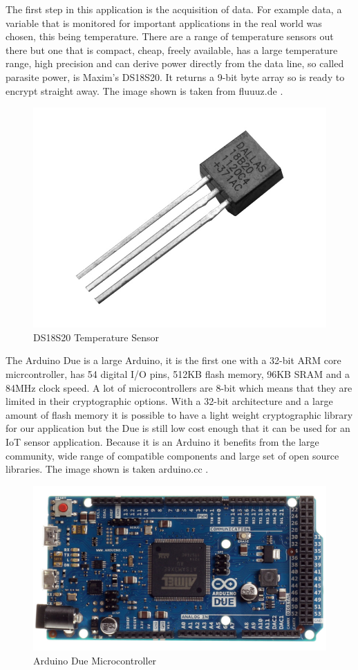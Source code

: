 The first step in this application is the acquisition of data. For example data, a variable that is monitored for important applications in the real world was chosen, this being temperature. There are a range of temperature sensors out there but one that is compact, cheap, freely available, has a large temperature range, high precision and can derive power directly from the data line, so called parasite power, is Maxim's DS18S20. It returns a 9-bit byte array so is ready to encrypt straight away. The image shown is taken from fluuuz.de \cite{dsimage}.

\begin{figure}[H]
	\centering
	\includegraphics[width=.4\linewidth]{Figures/ds.jpg}
	\caption{DS18S20 Temperature Sensor}
	\label{fig:ds}
\end{figure}

The Arduino Due is a large Arduino, it is the first one with a 32-bit ARM core micrcontroller, has 54 digital I/O pins, 512KB flash memory, 96KB SRAM and a 84MHz clock speed. A lot of microcontrollers are 8-bit which means that they are limited in their cryptographic options. With a 32-bit architecture and a large amount of flash memory it is possible to have a light weight cryptographic library for our application but the Due is still low cost enough that it can be used for an IoT sensor application. Because it is an Arduino it benefits from the large community, wide range of compatible components and large set of open source libraries. The image shown is taken arduino.cc \cite{dueimage}.

\begin{figure}[H]
	\centering
	\includegraphics[width=.4\linewidth]{Figures/due.jpg}
	\caption{Arduino Due Microcontroller}
	\label{fig:due}
\end{figure}

